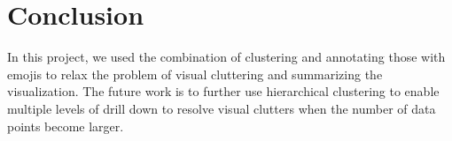 \section{Conclusion}
In this project, we used the combination of clustering and annotating those with emojis to relax the problem of visual cluttering and summarizing the visualization. 
The future work is to further use hierarchical clustering to enable multiple levels of drill down to resolve visual clutters when the number of data points become larger.

